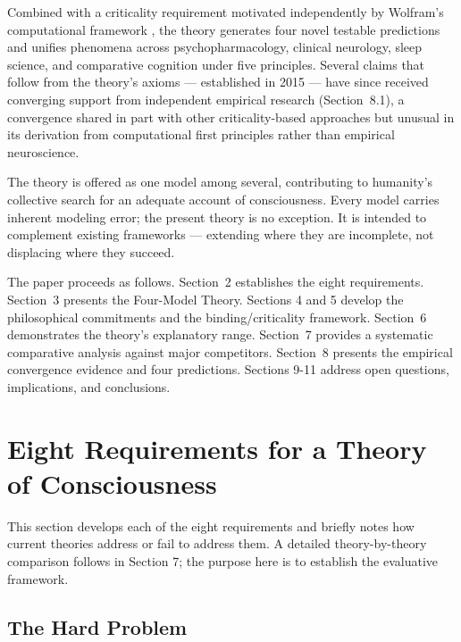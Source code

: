 \documentclass[12pt]{article}
\newcommand{\rev}[1]{#1}
\newcommand{\revstart}{}
\newcommand{\revend}{}
\begin{document}
Combined with a criticality requirement \rev{motivated} independently by Wolfram's computational framework \citep{Wolfram2002}, the theory generates four novel testable predictions and unifies phenomena across psychopharmacology, clinical neurology, sleep science, and comparative cognition under five principles. {\revstart Several claims that follow from the theory's axioms --- established in 2015 --- have since received converging support from independent empirical research (Section~8.1), a convergence shared in part with other criticality-based approaches but unusual in its derivation from computational first principles rather than empirical neuroscience.\revend}

The theory is offered as one model among several, contributing to humanity's collective search for an adequate account of consciousness. Every model carries inherent modeling error; the present theory is no exception. It is intended to complement existing frameworks --- extending where they are incomplete, not displacing where they succeed.

The paper proceeds as follows. Section~2 establishes the eight requirements. Section~3 presents the Four-Model Theory. Sections 4 and 5 develop the philosophical commitments and the binding/criticality framework. Section~6 demonstrates the theory's explanatory range. Section~7 provides a systematic comparative analysis against major competitors. Section~8 presents the empirical convergence evidence and four predictions. Sections 9-11 address open questions, implications, and conclusions.



\section{Eight Requirements for a Theory of Consciousness}


This section develops each of the eight requirements and briefly notes how current theories address or fail to address them. A detailed theory-by-theory comparison follows in Section 7; the purpose here is to establish the evaluative framework.


\subsection{The Hard Problem}
\end{document}
